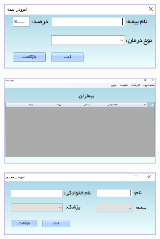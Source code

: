 \documentclass[a4paper,12pt]{report}
\begin{document}
\begin{figure}[!h]
\begin{subfigure}[t]{0.3\linewidth}
		\end{subfigure}
		\par\bigskip
		\vspace*{3mm}		
		\begin{subfigure}[t]{0.3\linewidth}
			\includegraphics[width=0.9\textwidth]{UI/Desktop_UI_4.png}
		\end{subfigure}
		\begin{subfigure}[t]{0.3\linewidth}
			\includegraphics[width=0.9\textwidth]{UI/Desktop_UI_5.PNG}
		\end{subfigure}
		\begin{subfigure}[t]{0.3\linewidth}
			\includegraphics[width=0.9\textwidth]{UI/Desktop_UI_6.PNG}
		\end{subfigure}
		\par\bigskip
		\vspace*{3mm}		
		\begin{subfigure}[t]{0.6\linewidth}

\end{subfigure}
\end{figure}
\end{document}
